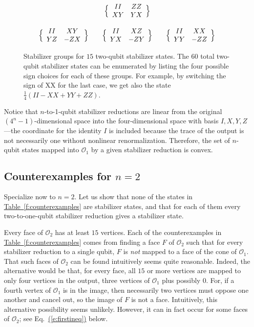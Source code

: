 \documentclass[11pt]{article}
\theoremstyle{note}
\newcommand{\eqnref}[1]{\hyperref[#1]{{(\ref*{#1})}}}
\newcommand{\tabref}[1]{\hyperref[#1]{{Table~\ref*{#1}}}}
\begin{document}
\begin{figure}
\begin{equation*}
\begin{array}{c @{\qquad} c @{\qquad} c}
&
\Big\{\begin{array}{cc}
II & ZZ \\
XY & YX
\end{array}\Big\}
\\
& & \\ %
\Big\{\begin{array}{cc}
II & XY \\
YZ & -ZX
\end{array}\Big\}
&
\Big\{\begin{array}{cc}
II & XZ \\
YX & -ZY
\end{array}\Big\}
&
\Big\{\begin{array}{cc}
II & XX \\
YY & -ZZ
\end{array}\Big\}
\end{array}
\end{equation*}
\caption{
Stabilizer groups for $15$ two-qubit stabilizer states.  The $60$ total two-qubit stabilizer states can be enumerated by listing the four possible sign choices for each of these groups.  For example, by switching the sign of XX for the last case, we get also the state $\tfrac{1}{4}(II - XX + YY + ZZ)$.
} \label{f:twoqubitstabilizerstates}
\end{figure}

Notice that $n$-to-1-qubit stabilizer reductions are linear from the original $(4^n-1)$-dimensional space into the four-dimensional space with basis $I, X, Y, Z$---the coordinate for the identity $I$ is included because the trace of the output is not necessarily one without nonlinear renormalization.  Therefore, the set of $n$-qubit states mapped into $\mathcal O_1$ by a given stabilizer reduction is convex.


\subsection{Counterexamples for $n = 2$}

Specialize now to $n = 2$.  Let us show that none of the states in \tabref{f:counterexamples} are stabilizer states, and that for each of them every two-to-one-qubit stabilizer reduction gives a stabilizer state.  

Every face of $\mathcal O_2$ has at least $15$ vertices.  Each of the counterexamples in \tabref{f:counterexamples} comes from finding a face $F$ of $\mathcal O_2$ such that for every stabilizer reduction to a single qubit, $F$ is \emph{not} mapped to a face of the cone of $\mathcal O_1$.  That such faces of $\mathcal O_2$ can be found intuitively seems quite reasonable.  Indeed, the alternative would be that, for every face, all $15$ or more vertices are mapped to only four vertices in the output, three vertices of $\mathcal O_1$ plus possibly $0$.  For, if a fourth vertex of $\mathcal O_1$ is in the image, then necessarily two vertices must oppose one another and cancel out, so the image of $F$ is not a face.  Intuitively, this alternative possibility seems unlikely.  However, it can in fact occur for some faces of $\mathcal O_2$; see Eq.~\eqnref{e:firstineq} below.
\end{document}
